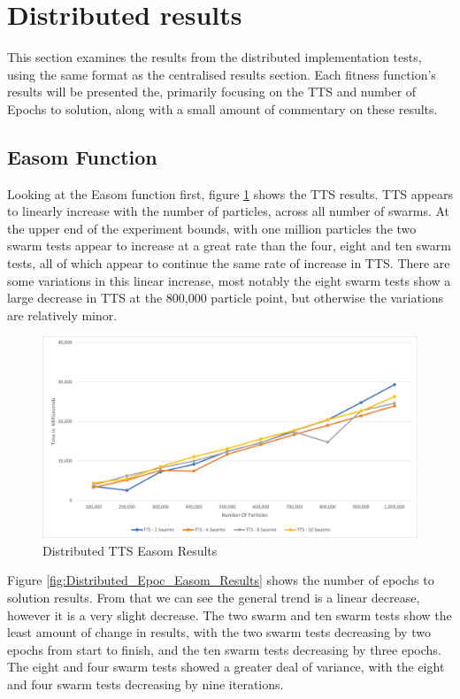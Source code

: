 \documentclass[oneside,12pt]{book}
\begin{document}
\section{Distributed results}
This section examines the results from the distributed implementation tests, using the same format as the centralised results section. Each fitness function's results will be presented the, primarily focusing on the TTS and number of Epochs to solution, along with a small amount of commentary on these results. 

\subsection{Easom Function}
Looking at the Easom function first, figure \ref{fig:Distributed_TTS_Easom_Results} shows the TTS results. TTS appears to linearly increase with the number of particles, across all number of swarms. At the upper end of the experiment bounds, with one million particles the two swarm tests appear to increase at a great rate than the four, eight and ten swarm tests, all of which appear to continue the same rate of increase in TTS. There are some variations in this linear increase, most notably the eight swarm tests show a large decrease in TTS at the 800,000 particle point, but otherwise the variations are relatively minor. 

\begin{figure}[H]
    \centering
    \includegraphics[scale=0.45]{Images/Graphs/DistributedEasomTTS.png}
    \caption{Distributed TTS Easom Results}
    \label{fig:Distributed_TTS_Easom_Results}
\end{figure}

Figure \ref{fig:Distributed_Epoc_Easom_Results} shows the number of epochs to solution results. From that we can see the general trend is a linear decrease, however it is a very slight decrease. The two swarm and ten swarm tests show the least amount of change in results, with the two swarm tests decreasing by two epochs from start to finish, and the ten swarm tests decreasing by three epochs. The eight and four swarm tests showed a greater deal of variance, with the eight and four swarm tests decreasing by nine iterations.
\end{document}
